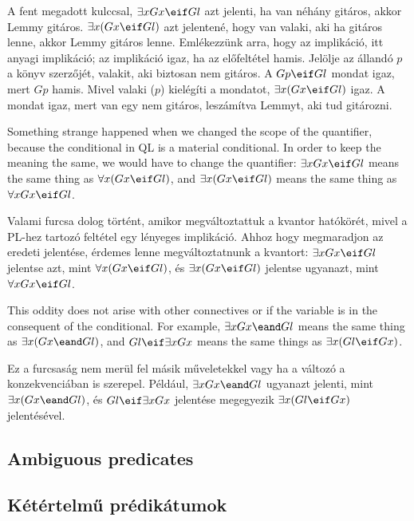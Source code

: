 A fent megadott kulccsal, $\exists x Gx \eif Gl$ azt jelenti, ha van néhány gitáros, akkor Lemmy gitáros. $\exists x (Gx \eif Gl)$ azt jelentené, hogy van valaki, aki ha gitáros lenne, akkor Lemmy gitáros lenne. Emlékezzünk arra, hogy az implikáció, itt anyagi implikáció; az implikáció igaz, ha az előfeltétel hamis. Jelölje az állandó $p$ a könyv szerzőjét, valakit, aki biztosan nem gitáros. A $Gp \eif Gl$ mondat igaz, mert $Gp$ hamis. Mivel valaki ($p$) kielégíti a mondatot, $\exists x (Gx \eif Gl)$ igaz. A mondat igaz, mert van egy nem gitáros, leszámítva Lemmyt, aki tud gitározni.





Something strange happened when we changed the scope of the quantifier, because the conditional in QL is a material conditional. In order to keep the meaning the same, we would have to change the quantifier: $\exists x Gx \eif Gl$ means the same thing as $\forall x (Gx \eif Gl)$, and $\exists x (Gx \eif Gl)$ means the same thing as $\forall x Gx \eif Gl$.

Valami furcsa dolog történt, amikor megváltoztattuk a kvantor hatókörét, mivel a PL-hez tartozó feltétel egy lényeges implikáció. Ahhoz hogy megmaradjon az eredeti jelentése, érdemes lenne megváltoztatnunk a kvantort: $\exists x Gx \eif Gl$ jelentse azt, mint $\forall x (Gx \eif Gl)$, és $\exists x (Gx \eif Gl)$ jelentse ugyanazt, mint $\forall x Gx \eif Gl$.

This oddity does not arise with other connectives or if the variable is in the consequent of the conditional. For example, $\exists x Gx \eand Gl$ means the same thing as $\exists x (Gx \eand Gl)$, and $Gl \eif \exists x Gx$ means the same things as $\exists x(Gl \eif Gx)$.

Ez a furcsaság nem merül fel másik műveletekkel vagy ha a változó a konzekvenciában is szerepel. Például, $\exists x Gx \eand Gl$ ugyanazt jelenti, mint $\exists x (Gx \eand Gl)$, és $Gl \eif \exists x Gx$ jelentése megegyezik $\exists x(Gl \eif Gx)$ jelentésével. 

\subsection*{Ambiguous predicates}
\subsection{Kétértelmű prédikátumok}

